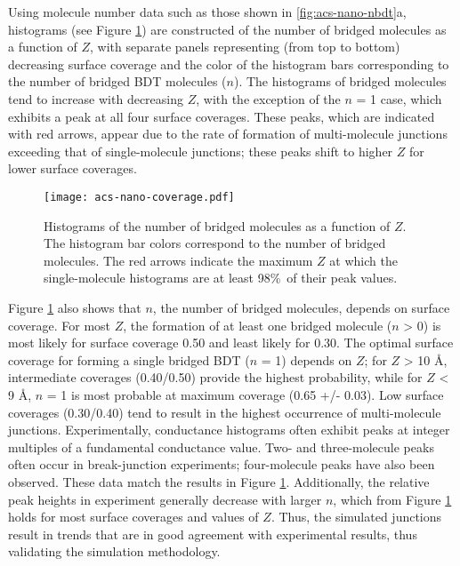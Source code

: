 \documentclass[10pt]{report}  %
\begin{document}
Using molecule number data such as those shown in \ref{fig:acs-nano-nbdt}a, histograms (see Figure \ref{fig:acs-nano-coverage}) are constructed of the number of bridged molecules as a function of $Z$, with separate panels representing (from top to bottom) decreasing surface coverage and the color of the histogram bars corresponding to the number of bridged BDT molecules ($n$).  The histograms of bridged molecules tend to increase with decreasing $Z$, with the exception of the $n$ = 1 case, which exhibits a peak at all four surface coverages.  These peaks, which are indicated with red arrows, appear due to the rate of formation of multi-molecule junctions exceeding that of single-molecule junctions; these peaks shift to higher $Z$ for lower surface coverages.  

\begin{figure}[]
	\centering
	\texttt{[image: acs-nano-coverage.pdf]}
	\caption{Histograms of the number of bridged molecules as a function of $Z$.  The histogram bar colors correspond to the number of bridged molecules. The red arrows indicate the maximum $Z$ at which the single-molecule histograms are at least 98\%\ of their peak values.}
	\label{fig:acs-nano-coverage}
\end{figure}

Figure \ref{fig:acs-nano-coverage} also shows that $n$, the number of bridged molecules, depends on surface coverage.  For most $Z$, the formation of at least one bridged molecule ($n$ > 0) is most likely for surface coverage 0.50 and least likely for 0.30. The optimal surface coverage for forming a single bridged BDT ($n$ = 1) depends on $Z$; for $Z$ > 10 \AA, intermediate coverages (0.40/0.50) provide the highest probability, while for $Z$ < 9 \AA, $n$ = 1 is most probable at maximum coverage (0.65 +/- 0.03). Low surface coverages (0.30/0.40) tend to result in the highest occurrence of multi-molecule junctions.  Experimentally, conductance histograms often exhibit peaks at integer multiples of a fundamental conductance value.\cite{Xu:2003,Xiao:2004,Tsutsui:2009,Li:2008}  Two- and three-molecule peaks often occur in break-junction experiments; \cite{Xu:2003,Xiao:2004,Tsutsui:2009} four-molecule peaks have also been observed. \cite{Li:2008}  These data match the results in Figure \ref{fig:acs-nano-coverage}.  Additionally, the relative peak heights in experiment generally decrease with larger $n$, which from Figure \ref{fig:acs-nano-coverage} holds for most surface coverages and values of $Z$. Thus, the simulated junctions result in trends that are in good agreement with experimental results, thus validating the simulation methodology.
\end{document}
